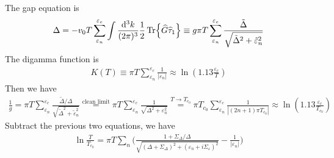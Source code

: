\documentclass[]{article}
\begin{document}
The gap equation is
\begin{align}\label{eq:gap_eq}
    \Delta = -v_0 T\sum_{\varepsilon_n}^{\varepsilon_c}\int\frac{\dd[3]k}{(2\pi)^3}\frac{1}{2}\Tr{\widehat{G}\widehat{\tau}_1}
    \equiv g\pi T\sum_{\varepsilon_n}^{\varepsilon_c}\frac{\tilde{\Delta}}{\sqrt{\tilde{\Delta}^2 + \tilde{\varepsilon}_n^2}}
\end{align}
The digamma function is
\begin{align}\label{eq:digamma}
    K(T) \equiv \pi T \sum_{\varepsilon_n}^{\varepsilon_c}\frac{1}{|\varepsilon_n|} \approx \ln(1.13\frac{\varepsilon_c}{T})
\end{align}
Then we have
\begin{align}
    \frac{1}{g} = \pi T\sum_{\varepsilon_n}^{\varepsilon_c}
    \frac{\tilde{\Delta}/\Delta}{\sqrt{\tilde{\Delta}^2 + \tilde{\varepsilon}_n^2}}
    \overset{\text{clean limit}}{=} \pi T\sum_{\varepsilon_n}^{\varepsilon_c}
    \frac{1}{\sqrt{\Delta^2 + \varepsilon_n^2}}
    \overset{T\rightarrow T_{c_0}}{=}\pi T_{c_0}\sum_{\varepsilon_n}^{\varepsilon_c}\frac{1}{|(2n+1)\pi T_{c_0}|}
    \approx \ln(1.13\frac{\varepsilon_c}{T_{c_0}})
\end{align}
Subtract the previous two equations, we have
\begin{align}
    \ln\frac{T}{T_{c_0}} = \pi T\sum_n
    \Bigg(\frac{1 + \Sigma_\Delta/\Delta}{\sqrt{(\Delta + \Sigma_\Delta)^2 + (\varepsilon_n + i\Sigma_\varepsilon)^2}}
    - \frac{1}{|\varepsilon_n|}\Bigg)
\end{align}
\end{document}
